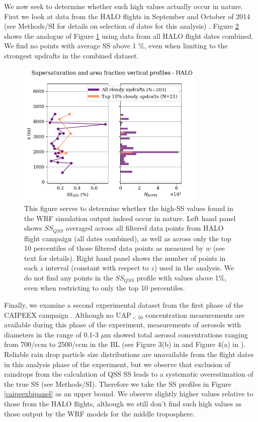 \documentclass{article}
\begin{document}
\begin{figure}[ht]
	\label{wrfbipanel}
\end{figure}

\clearpage
\newpage

We now seek to determine whether such high values actually occur in nature. First we look at data from the HALO flights in September and October of 2014 (see Methods/SI for details on selection of dates for this analysis) \cite{Wendisch2016}. Figure \ref{halobipanel} shows the analogue of Figure \ref{wrfbipanel} using data from all HALO flight dates combined. We find no points with average SS above 1 \%, even when limiting to the strongest updrafts in the combined dataset.

\begin{figure}[ht]
    \centering
    \includegraphics[width=9cm]{revhalo/v8_FINAL_combined_bipanel_ss_qss_vs_z_figure.png}
    \caption{This figure serves to determine whether the high-SS values found in the WRF simulation output indeed occur in nature. Left hand panel shows $SS_{QSS}$ averaged across all filtered data points from HALO flight campaign (all dates combined), as well as across only the top 10 percentiles of those filtered data points as measured by $w$ (see text for details). Right hand panel shows the number of points in each $z$ interval (constant with respect to $z$) used in the analysis. We do not find any points in the $SS_{QSS}$ profile with values above 1\%, even when restricting to only the top 10 percentiles.}
    \label{halobipanel}
\end{figure}

Finally, we examine a second experimental dataset from the first phase of the CAIPEEX campaign \cite{Kulkarni2012}. Although no UAP$_{<50}$ concentration measurements are available during this phase of the experiment, measurements of aerosols with diameters in the range of 0.1-3 $\mu$m showed total aerosol concentrations ranging from 700/ccm to 2500/ccm in the BL (see Figure 3(b) in \cite{Prabha2011} and Figure 4(a) in \cite{Kulkarni2012}). Reliable rain drop particle size distributions are unavailable from the flight dates in this analysis phase of the experiment, but we observe that exclusion of raindrops from the calculation of QSS SS leads to a systematic overestimation of the true SS (see Methods/SI). Therefore we take the SS profiles in Figure \ref{caipeexbipanel} as an upper bound. We observe slightly higher values relative to those from the HALO flights, although we still don't find such high values as those output by the WRF models for the middle troposphere.
\end{document}
